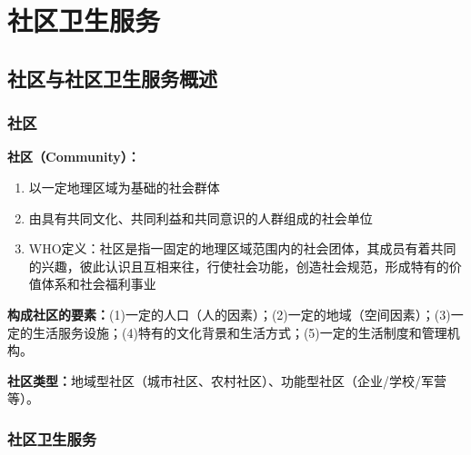 \chapter{社区卫生服务}
\setcounter{chapter}{17}

\section{社区与社区卫生服务概述}

\subsection{社区}

\begin{defbox}
\textbf{社区（Community）：}
\begin{enumerate}[leftmargin=*]
    \item 以一定地理区域为基础的社会群体
    \item 由具有共同文化、共同利益和共同意识的人群组成的社会单位
    \item WHO定义：社区是指一固定的地理区域范围内的社会团体，其成员有着共同的兴趣，彼此认识且互相来往，行使社会功能，创造社会规范，形成特有的价值体系和社会福利事业
\end{enumerate}

\textbf{构成社区的要素：}(1)一定的人口（人的因素）；(2)一定的地域（空间因素）；(3)一定的生活服务设施；(4)特有的文化背景和生活方式；(5)一定的生活制度和管理机构。

\textbf{社区类型：}地域型社区（城市社区、农村社区）、功能型社区（企业/学校/军营等）。
\end{defbox}

\subsection{社区卫生服务}

